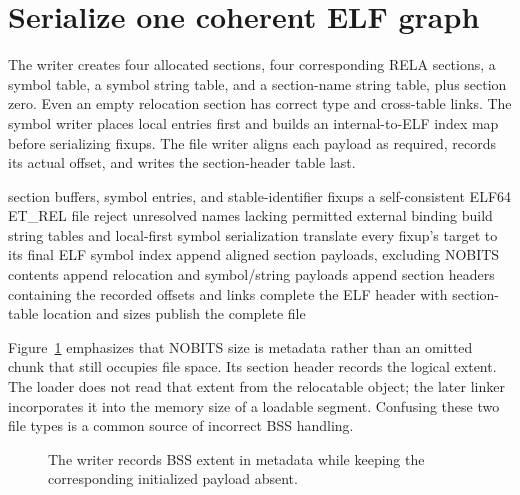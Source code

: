 \section{Serialize one coherent ELF graph}
\label{sec:ch56-object}

The writer creates four allocated sections, four corresponding RELA sections, a symbol table, a symbol string table, and a section-name string table, plus section zero.
Even an empty relocation section has correct type and cross-table links.
The symbol writer places local entries first and builds an internal-to-ELF index map before serializing fixups.
The file writer aligns each payload as required, records its actual offset, and writes the section-header table last.

\begin{algorithm}[htbp]
\caption{Finish the case-study relocatable object only after all consistency checks succeed.}
\label{alg:ch56-object}
\begin{pseudocode}
\Require section buffers, symbol entries, and stable-identifier fixups
\Ensure a self-consistent ELF64 ET\_REL file
\State reject unresolved names lacking permitted external binding
\State build string tables and local-first symbol serialization
\State translate every fixup's target to its final ELF symbol index
\State append aligned section payloads, excluding NOBITS contents
\State append relocation and symbol/string payloads
\State append section headers containing the recorded offsets and links
\State complete the ELF header with section-table location and sizes
\State publish the complete file
\end{pseudocode}
\end{algorithm}

Figure~\ref{fig:ch56-file} emphasizes that NOBITS size is metadata rather than an omitted chunk that still occupies file space.
Its section header records the logical extent.
The loader does not read that extent from the relocatable object; the later linker incorporates it into the memory size of a loadable segment.
Confusing these two file types is a common source of incorrect BSS handling.

\begin{figure}[htbp]
\centering
{}
\caption{The writer records BSS extent in metadata while keeping the corresponding initialized payload absent.}
\label{fig:ch56-file}
\end{figure}

